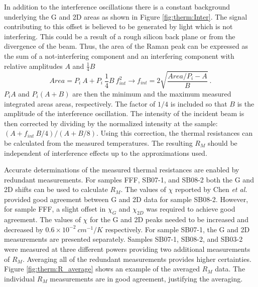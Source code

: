 In addition to the interference oscillations there is a constant background underlying the G and 2D areas as shown in Figure \ref{fig:therm:Inter}.
The signal contributing to this offset is believed to be generated by light which is not interfering.
This could be a result of a rough silicon back plane or from the divergence of the beam.
Thus, the area of the Raman peak can be expressed as the sum of a not-interfering component and an interfering component with relative amplitudes $A$ and $\frac{1}{4} B$
\begin{equation*}
	Area=P_i \ A+P_i \ \frac{1}{4} B \ f_{int}^2 \rightarrow  f_{int}=2\sqrt{\frac{Area/P_i-A}{B}} \ .
\end{equation*}
$P_i A$ and $P_i (A+B)$ are then the minimum and the maximum measured integrated areas areas, respectively.
The factor of $1/4$ is included so that $B$ is the amplitude of the interference oscillation.
The intensity of the incident beam is then corrected by dividing by the normalized intensity at the sample: $(A+f_{int} \ B/4)/(A+B/8)$.
Using this correction, the thermal resistances can be calculated from the measured temperatures.
The resulting $R_M$ should be independent of interference effects up to the approximations used.

Accurate determinations of the measured thermal resistances are enabled by redundant measurements.
For samples FFF, SB07-1, and SB08-2 both the G and 2D shifts can be used to calculate $R_M$.
The values of $\chi$ reported by Chen \textit{et al.} \cite{Chen2011a} provided good agreement between G and 2D data for sample SB08-2.
However, for sample FFF, a slight offset in $\chi_G$ and $\chi_{2D}$ was required to achieve good agreement.
The values of $\chi$ for the G and 2D peaks needed to be increased and decreased by $0.6 \times 10^{-2} \ cm^{-1}/K$ respectively.
For sample SB07-1, the G and 2D measurements are presented separately.
Samples SB07-1, SB08-2, and SB03-2 were measured at three different powers providing two additional measurements of $R_M$.
Averaging all of the redundant measurements provides higher certainties.
Figure \ref{fig:therm:R_average} shows an example of the averaged $R_M$ data.
The individual $R_M$ measurements are in good agreement, justifying the averaging.

